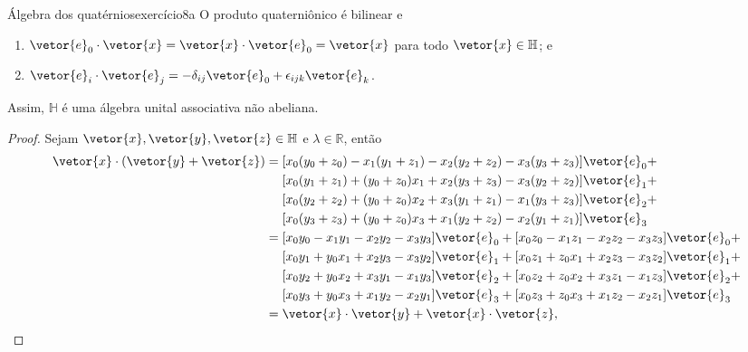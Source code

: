 \begin{proposition}{Álgebra dos quatérnios}{exercício8a}
    O produto quaterniônico é bilinear e
    \begin{enumerate}[label=(\alph*)]
        \item \(\vetor{e}_0\cdot\vetor{x} = \vetor{x}\cdot\vetor{e}_0 = \vetor{x}\) para todo \(\vetor{x} \in \mathbb{H}\); e
        \item \(\vetor{e}_{i}\cdot\vetor{e}_j = - \delta_{ij} \vetor{e}_0 + \epsilon_{ijk} \vetor{e}_k\).
    \end{enumerate}
    Assim, \(\mathbb{H}\) é uma álgebra unital associativa não abeliana.
\end{proposition}
\begin{proof}
    Sejam \(\vetor{x}, \vetor{y}, \vetor{z} \in \mathbb{H}\) e \(\lambda \in \mathbb{R}\), então
    \begin{align*}
        \vetor{x}\cdot(\vetor{y} + \vetor{z}) &= [x_0 (y_0+z_0) - x_1 (y_1+z_1) - x_2(y_2+z_2) - x_3(y_3+z_3)]\vetor{e}_0 +\\
                                              &\mathrel{\phantom{=}}[x_0(y_1+z_1) + (y_0+z_0) x_1 + x_2(y_3+z_3) - x_3 (y_2+z_2)]\vetor{e}_1 +\\
                                              &\mathrel{\phantom{=}}[x_0(y_2+z_2) + (y_0+z_0)x_2 + x_3(y_1+z_1) - x_1(y_3+z_3)]\vetor{e}_2 +\\
                                              &\mathrel{\phantom{=}}[x_0(y_3+z_3) + (y_0+z_0)x_3 + x_1(y_2+z_2) - x_2(y_1+z_1)]\vetor{e}_3\\
                                              &= [x_0 y_0 - x_1 y_1 - x_2y_2 - x_3y_3]\vetor{e}_0 +[x_0 z_0 - x_1 z_1 - x_2z_2 - x_3z_3]\vetor{e}_0 +\\
                                              &\mathrel{\phantom{=}}[x_0y_1+ y_0 x_1 + x_2y_3 - x_3 y_2]\vetor{e}_1 +[x_0z_1+ z_0 x_1 + x_2z_3 - x_3 z_2]\vetor{e}_1 +\\
                                              &\mathrel{\phantom{=}}[x_0y_2 + y_0x_2 + x_3y_1 - x_1y_3]\vetor{e}_2 +[x_0z_2 + z_0x_2 + x_3z_1 - x_1z_3]\vetor{e}_2 +\\
                                              &\mathrel{\phantom{=}}[x_0y_3 + y_0x_3 + x_1y_2 - x_2y_1]\vetor{e}_3 + [x_0z_3 + z_0x_3 + x_1z_2 - x_2z_1]\vetor{e}_3\\
                                              &= \vetor{x}\cdot\vetor{y} + \vetor{x}\cdot\vetor{z},\\

\end{align*}
\end{proof}
